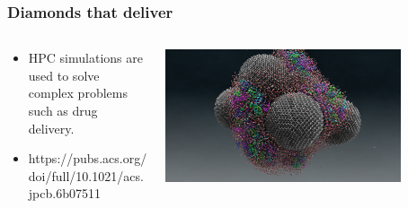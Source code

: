 \begin{frame}
\frametitle{Diamonds that deliver}
\begin{columns}
    \begin{column}{0.5\paperwidth}
    \begin{itemize}
        \item HPC simulations are used to solve complex problems such as drug
        delivery.
        \item https://pubs.acs.org/doi/full/10.1021/acs.jpcb.6b07511
    \end{itemize}
    \end{column}
    \begin{column}{0.5\paperwidth}
        \center\includegraphics[width=0.8\textwidth]{NanoDiamond.png}
    \end{column}
\end{columns}
\end{frame}
